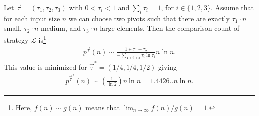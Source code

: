 \documentclass[prodmode,acmtalg]{acmsmall}
\let\accentvec\vec
\let\vec\accentvec
\begin{document}
\begin{lemma}
    Let $\vec{\tau} = (\tau_1, \tau_2, \tau_3)$ with $0 < \tau_i < 1$ and $\sum_{i}\tau_i = 1$, for
    $i \in \{1,2,3\}$. Assume that for each input size $n$ we can choose two pivots such that there are
    exactly $\tau_1 \cdot n$ small, $\tau_2 \cdot n$ medium, and $\tau_3 \cdot n$ large elements. Then
    the comparison count of strategy $\mathcal{L}$ is\footnote{Here, 
    $f(n)\sim g(n)$ means that $\lim_{n \rightarrow \infty} f(n)/g(n) = 1$.}
    \begin{align*}
	p^{\vec{\tau}}(n) \sim \frac{1+\tau_1+\tau_2}{-\sum_{1 \leq i \leq 3}
	\tau_i \ln \tau_i} n \ln n.
    \end{align*}
This value is minimized for $\vec{\tau}^\ast = (1/4, 1/4, 1/2)$ giving 
\begin{align*}
    p^{\vec{\tau}^\ast}\!(n) \sim \left(\frac{1}{\ln 2}\right) n \ln n = 1.4426.. n \ln
    n.
\end{align*}
\end{lemma}
\end{document}
